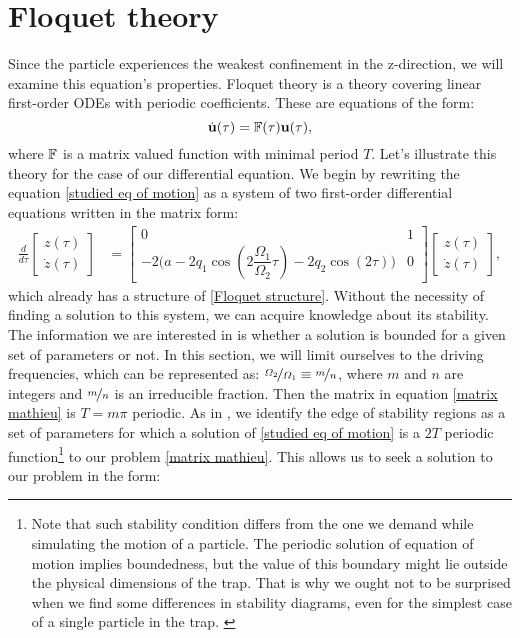 \section{Floquet theory}
\label{sec:floquet}

Since the particle experiences the weakest confinement in the z-direction, we will examine this equation's properties. Floquet theory is a theory covering linear first-order ODEs with periodic coefficients. These are equations of the form:
\begin{equation}
	\label{Floquet structure}
	\dot{\vb{u}}(\tau) = \mathbb{F}(\tau) \vb{u}(\tau),
\end{equation}
where $\mathbb{F}$ is a matrix valued function with minimal period $T$. Let's illustrate this theory for the case of our differential equation. We begin by rewriting the equation \eqref{studied eq of motion} as a system of two first-order differential equations written in the matrix form:
\begin{align}
\label{matrix mathieu}
	\frac{d}{d \tau}
	\begin{bmatrix}
		z(\tau) \\
		\dot{z}(\tau)
	\end{bmatrix}	
	&=
	\begin{bmatrix}
		0 & 1 \\
		-2\bigg( a - 2 q_1 \cos\left(2\dfrac{\Omega_1}{\Omega_2} \tau \right) - 2 q_2 \cos(2\tau) \bigg) & 0	
	\end{bmatrix}
	\begin{bmatrix}
		z(\tau) \\
		\dot{z}(\tau)
	\end{bmatrix},
\end{align}
which already has a structure of \eqref{Floquet structure}. Without the necessity of finding a solution to this system, we can acquire knowledge about its stability. The information we are interested in is whether a solution is bounded for a given set of parameters or not. In this section, we will limit ourselves to the driving frequencies, which can be represented as: $\nicefrac{\Omega_2}{\Omega_1} \equiv \nicefrac{m}{n}$, where $m$ and $n$ are integers and $\nicefrac{m}{n}$ is an irreducible fraction. Then the matrix in equation \eqref{matrix mathieu} is $T = m \pi$ periodic. As in \cite{leefer2017investigation}, we identify the edge of stability regions as a set of parameters for which a solution of \eqref{studied eq of motion} is a $2T$ periodic function\footnote{Note that such stability condition differs from the one we demand while simulating the motion of a particle. The periodic solution of equation of motion implies boundedness, but the value of this boundary might lie outside the physical dimensions of the trap. That is why we ought not to be surprised when we find some differences in stability diagrams, even for the simplest case of a single particle in the trap. \label{foot: different stability condition}} to our problem \eqref{matrix mathieu}. This allows us to seek a solution to our problem in the form:
